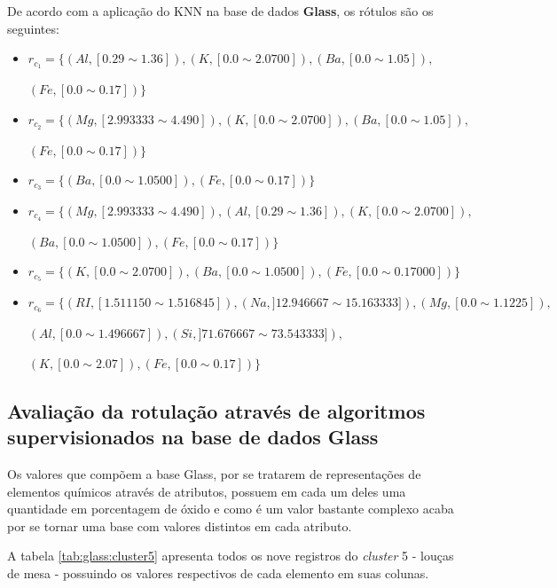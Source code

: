De acordo com a aplicação do KNN na base de dados \textbf{Glass}, os rótulos são os seguintes:
\begin{itemize}[noitemsep]
 \item ${r_{c_1}=\{(Al,[ 0.29 \sim 1.36 ] ),(K,[ 0.0 \sim  2.0700 ] ), (Ba,[ 0.0 \sim 1.05 ] ),}$
 
 ${ (Fe,[ 0.0 \sim 0.17] )  \} }$
 \item ${r_{c_2}=\{(Mg, [ 2.993333 \sim  4.490]),(K,[ 0.0 \sim  2.0700 ] ), (Ba,[ 0.0 \sim 1.05 ] ),}$
 
 ${ (Fe,[ 0.0 \sim 0.17] )  \} }$
 \item ${r_{c_3}=\{ (Ba,[ 0.0 \sim 1.0500 ] ),(Fe,[ 0.0 \sim 0.17] )  \} }$
 \item ${r_{c_4}=\{(Mg, [ 2.993333 \sim  4.490]), (Al,[ 0.29 \sim 1.36 ] ),(K,[ 0.0 \sim  2.0700 ] ),}$
 
 ${ (Ba,[ 0.0 \sim 1.0500 ] ), (Fe,[ 0.0 \sim 0.17] )  \} }$
 \item ${r_{c_5}=\{ (K,[ 0.0 \sim  2.0700 ] ), (Ba,[ 0.0 \sim 1.0500 ] ), (Fe,[ 0.0 \sim 0.17000] ) \} }$
 \item ${r_{c_6}=\{ (RI,[ 1.511150 \sim  1.516845  ] ),(Na,]12.946667 \sim 15.163333 ] ),  (Mg,[ 0.0 \sim  1.1225  ] ), }$
 
 ${ (Al,[0.0 \sim  1.496667 ] ), (Si,] 71.676667 \sim  73.543333 ] ),  }$
 
 ${ (K,[ 0.0 \sim 2.07] ),(Fe,[ 0.0 \sim 0.17 ] ) \} }$
\end{itemize}


\subsection{Avaliação da rotulação através de algoritmos supervisionados na base de dados Glass} \label{cap:resultados:ssec:compalgoritmos:glass}


Os valores que compõem a base Glass, por se tratarem de representações de elementos químicos através de atributos, possuem em cada um deles uma quantidade em porcentagem de óxido e como é um valor bastante complexo acaba por se tornar uma base com valores distintos em cada atributo. 

A tabela \ref{tab:glass:cluster5} apresenta todos os nove registros do \textit{cluster} 5 - louças de mesa - possuindo os valores respectivos de cada elemento em suas colunas.


